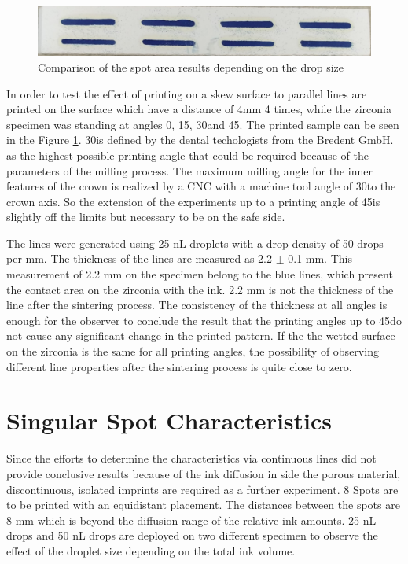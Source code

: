 	\bigskip

	\begin{figure}[H]
		\centering
		\includegraphics[width=1\textwidth]{grafiken/angleprint.jpg}
		\caption{Comparison of the spot area results depending on the drop size}
		\label{fig:angleprint}
	\end{figure} 

	\bigskip

In order to test the effect of printing on a skew surface to parallel lines are printed on the surface which have a distance of 4mm 4 times, while the zirconia specimen was standing at angles 0\textdegree \space, 15\textdegree \space, 30\textdegree \space and 45\textdegree \space. The printed sample can be seen in the Figure \ref{fig:angleprint}. 30\textdegree \space is defined by the dental techologists from the Bredent GmbH. as the highest possible printing angle that could be required because of the parameters of the milling process. The maximum milling angle for the inner features of the crown is realized by a CNC with a machine tool angle of 30\textdegree \space to the crown axis. So the extension of the experiments up to a printing angle of 45\textdegree \space is slightly off the limits but necessary to be on the safe side.

The lines were generated using 25 nL droplets with a drop density of 50 drops per mm. The thickness of the lines are measured as 2.2 $\pm$ 0.1 mm. This measurement of 2.2 mm on the specimen belong to the blue lines, which present the contact area on the zirconia with the ink. 2.2 mm is not the thickness of the line after the sintering process. The consistency of the thickness at all angles is enough for the observer to conclude the result that the printing angles up to 45\textdegree \space do not cause any significant change in the printed pattern. If the the wetted surface on the zirconia is the same for all printing angles, the possibility of observing different line properties after the sintering process is quite close to zero.

\section{Singular Spot Characteristics}

Since the efforts to determine the characteristics via continuous lines did not provide conclusive results because of the ink diffusion in side the porous material, discontinuous, isolated imprints are required as a further experiment. 8 Spots are to be printed with an equidistant placement. The distances between the spots are 8 mm which is beyond the diffusion range of the relative ink amounts. 25 nL drops and 50 nL drops are deployed on two different specimen to observe the effect of the droplet size depending on the total ink volume. 

